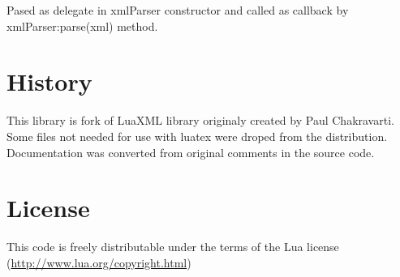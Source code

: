 \documentclass{ltxdoc}
\begin{document}
Pased as delegate in xmlParser constructor and called as callback by
xmlParser:parse(xml) method.

\section{History}

This library is fork of LuaXML library originaly created by Paul
Chakravarti.  Some files not needed for use with luatex were droped from the distribution.
Documentation was converted from original comments in the source code.

\section{License}

This code is freely distributable under the terms of the Lua license
(\url{http://www.lua.org/copyright.html})
\end{document}
